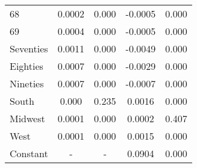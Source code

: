 \documentclass[11pt]{article}
\theoremstyle{definition}
\begin{document}
\begin{center}
\begin{tabular}{l c c c c}
 68  & 0.0002 & 0.000 & -0.0005 & 0.000 \\
 69  & 0.0004 & 0.000 & -0.0005 & 0.000 \\
 Seventies  & 0.0011 & 0.000 & -0.0049 & 0.000 \\
 Eighties  & 0.0007 & 0.000 & -0.0029 & 0.000 \\
 Nineties  & 0.0007 & 0.000 & -0.0007 & 0.000 \\
 South  & 0.000 & 0.235 & 0.0016 & 0.000 \\
 Midwest  & 0.0001 & 0.000 & 0.0002 & 0.407 \\
 West & 0.0001 & 0.000 & 0.0015 & 0.000 \\
 Constant & - & - & 0.0904 & 0.000 \\
\hline\hline
\end{tabular} 
\end{center}
\end{document}
